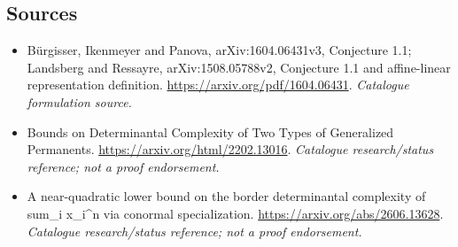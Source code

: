 \documentclass[11pt,a4paper]{article}
\numberwithin{equation}{section}
\begin{document}
\subsection{Sources}
\begin{itemize}\raggedright
\item[\textnormal{[S1]}]\hypertarget{source:30006699:1}{} Bürgisser, Ikenmeyer and Panova, arXiv:1604.06431v3, Conjecture 1.1; Landsberg and Ressayre, arXiv:1508.05788v2, Conjecture 1.1 and affine-linear representation definition.
\url{https://arxiv.org/pdf/1604.06431}.
{\small\textit{Catalogue formulation source.}}
\item[\textnormal{[S2]}]\hypertarget{source:30006699:2}{} Bounds on Determinantal Complexity of Two Types of Generalized Permanents.
\url{https://arxiv.org/html/2202.13016}.
{\small\textit{Catalogue research/status reference; not a proof endorsement.}}
\item[\textnormal{[S3]}]\hypertarget{source:30006699:3}{} A near-quadratic lower bound on the border determinantal complexity of sum\_i x\_i\textasciicircum{}n via conormal specialization.
\url{https://arxiv.org/abs/2606.13628}.
{\small\textit{Catalogue research/status reference; not a proof endorsement.}}


\end{itemize}
\end{document}
